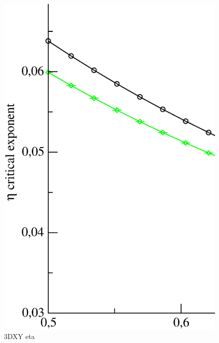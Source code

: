 \begin{figure}[!htpb]
  \centering
  \includegraphics[width=\textwidth]{./plots/3DXY/vsO/eta.eps}
  \caption{3DXY eta}
\end{figure}


